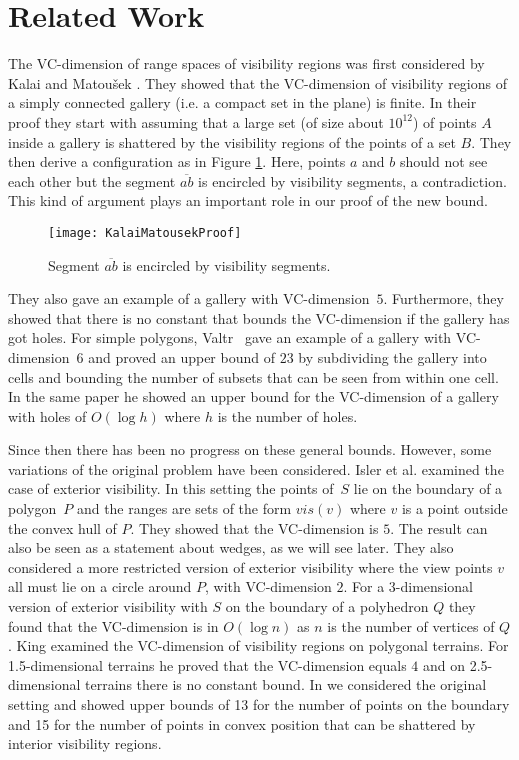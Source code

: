 \documentclass[11pt]{article}
\begin{document}
\section{Related Work}         \label{related-sec}

The VC-dimension of range spaces of visibility regions was first considered by Kalai and Matou\v sek \cite{km-ggwep-97}.
They showed that the VC-dimension of visibility regions of a simply connected gallery (i.e. a compact set in the plane) is finite.
In their proof they start with assuming that a large set (of size about $10^{12}$) of points $A$ inside a gallery is shattered by the visibility regions of the points of a set $B$. They then derive a configuration as in Figure \ref{KalaiMatousekProof-fig}. Here, points $a$ and $b$ should not see each other but the segment $\overline{ab}$ is encircled by visibility segments, a contradiction. This kind of argument plays an important role in our proof of the new bound.
\begin{figure}[hbtp]\begin{center}\texttt{[image: KalaiMatousekProof]}\caption{Segment $\overline{ab}$ is encircled by visibility segments.}\label{KalaiMatousekProof-fig}
  \end{center}\end{figure}
They also gave an example of a gallery with VC-dimension~$5$. Furthermore, they showed that there is no constant that bounds the VC-dimension
if the gallery has got holes.  
For simple polygons, Valtr~\cite{v-ggwps-98} gave an example of a gallery with VC-dimension~$6$ and proved an upper bound of $23$ by subdividing the gallery into
cells and bounding the number of subsets that can be seen from within one cell. In the same paper he showed an upper bound for the VC-dimension of a 
gallery with holes of $O(\log h)$ where $h$ is the number of holes.

Since then there has been no progress on these general bounds. However, some variations of the original problem have been considered.
Isler et al. \cite{ikdv-vcdev-04} examined the case of exterior visibility. In this setting the points of~$S$ lie on the boundary of a polygon~$P$
and the ranges are sets of the form $vis(v)$ where $v$ is a point outside the convex hull of $P$. They showed that the VC-dimension is $5$.
The result can also be seen as a statement about wedges, as we will see later.
They also considered a more restricted version of exterior visibility where the view points $v$ all must lie on a circle around $P$, 
with VC-dimension $2$. For a $3$-dimensional version of exterior visibility with $S$ on the boundary of a polyhedron $Q$ they found that the
VC-dimension is in $O(\log n)$ as $n$ is the number of vertices of $Q$.
King \cite{k-vcdvt-08} examined the VC-dimension of visibility regions on polygonal terrains. 
For 1.5-dimensional terrains he proved that the VC-dimension equals $4$ and on 2.5-dimensional terrains there is no constant bound.
In \cite{gk-nrvsp-09} we considered the original setting and showed upper bounds of 13 for the number of points on the boundary and 15 for the number of points in convex position that can be shattered by interior visibility regions.
\end{document}
